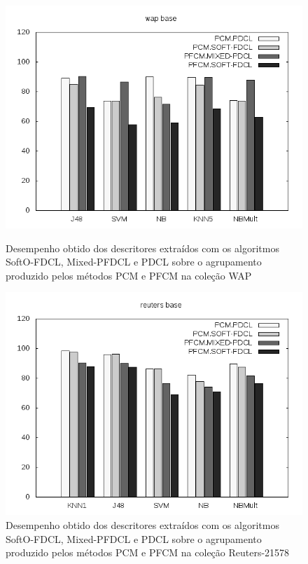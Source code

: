 \begin{figure}[!h] \centering 
   \begin{minipage}{0.48\textwidth} 
     \centering
    \includegraphics[width=1.0\columnwidth]{assets/pdcl/wap} 
    \caption{Desempenho obtido dos descritores extraídos com os algoritmos SoftO-FDCL, Mixed-PFDCL e
    PDCL sobre o agrupamento produzido pelos métodos PCM e PFCM na coleção WAP} 
    \label{fig:pdclwap}
  \end{minipage}\hfill 
  \begin{minipage}{0.48\textwidth} \centering
    \includegraphics[width=1.0\columnwidth]{assets/pdcl/reuters} 
    \caption{Desempenho obtido dos descritores extraídos com os algoritmos SoftO-FDCL, Mixed-PFDCL e
    PDCL sobre o agrupamento produzido pelos métodos PCM e PFCM na coleção Reuters-21578} 
     \label{fig:pdclreuters} 
   \end{minipage} 
\end{figure}

